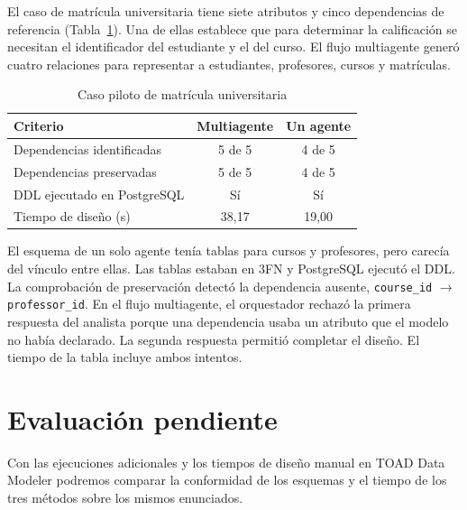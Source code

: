 \documentclass[conference]{IEEEtran}
\begin{document}
El caso de matrícula universitaria tiene siete atributos y cinco dependencias de referencia (Tabla~\ref{tab:piloto}). Una de ellas establece que para determinar la calificación se necesitan el identificador del estudiante y el del curso. El flujo multiagente generó cuatro relaciones para representar a estudiantes, profesores, cursos y matrículas.

\begin{table}[htbp]
\centering
\caption{Caso piloto de matrícula universitaria}
\label{tab:piloto}
\begin{tabular}{@{}lcc@{}}
\toprule
Criterio & Multiagente & Un agente \\
\midrule
Dependencias identificadas & 5 de 5 & 4 de 5 \\
Dependencias preservadas & 5 de 5 & 4 de 5 \\
DDL ejecutado en PostgreSQL & Sí & Sí \\
Tiempo de diseño (s) & 38,17 & 19,00 \\
\bottomrule
\end{tabular}
\end{table}

\balance
El esquema de un solo agente tenía tablas para cursos y profesores, pero carecía del vínculo entre ellas. Las tablas estaban en 3FN y PostgreSQL ejecutó el DDL. La comprobación de preservación detectó la dependencia ausente, \texttt{course\_id} $\to$ \texttt{professor\_id}. En el flujo multiagente, el orquestador rechazó la primera respuesta del analista porque una dependencia usaba un atributo que el modelo no había declarado. La segunda respuesta permitió completar el diseño. El tiempo de la tabla incluye ambos intentos.

\section{Evaluación pendiente}

Con las ejecuciones adicionales y los tiempos de diseño manual en TOAD Data Modeler podremos comparar la conformidad de los esquemas y el tiempo de los tres métodos sobre los mismos enunciados.
\end{document}
